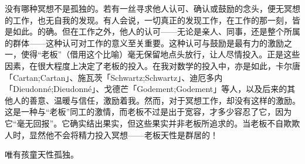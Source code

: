 没有哪种冥想不是孤独的。若有一丝寻求他人认可、确认或鼓励的念头，便无冥想的工作，也无自我的发现。有人会说，一切真正的发现工作，在工作的那一刻，皆是如此。的确。但在工作之外，他人的认可——无论是亲人、同事，还是整个所属的群体——这种认可对工作的意义至关重要。这种认可与鼓励是最有力的激励之一，使得“老板”（借用这个比喻）毫无保留地点头放行，让人尽情投入。正是这些因素，在很大程度上决定了老板的投入。在我对数学的投入中，亦是如此，卡尔唐「Cartan;Cartan」、施瓦茨「Schwartz;Schwartz」、迪厄多内「Dieudonné;Dieudonné」、戈德芒「Godement;Godement」等人，以及后来的其他人的善意、温暖与信任，激励着我。然而，对于冥想工作，却没有这样的激励。这是一种与“老板”同工的激情，而老板不过是出于宽容，才多少容忍了它，因为它“毫无回报”。它确实结出果实，但这些果实并非老板所追求的。当老板不自欺欺人时，显然他不会将精力投入冥想——老板天性是群居的！

唯有孩童天性孤独。